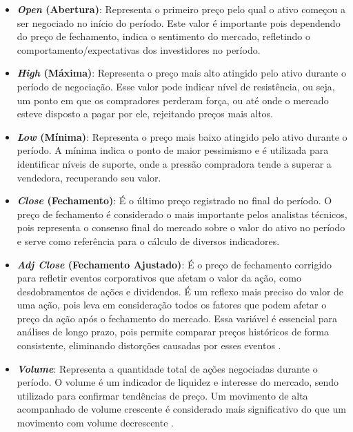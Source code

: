 \begin{itemize}
    \item \textbf{\textit{Open} (Abertura)}: Representa o primeiro preço pelo qual o ativo começou a ser negociado no início do período. Este valor é importante pois dependendo do preço de fechamento, indica o sentimento do mercado, refletindo o comportamento/expectativas dos investidores no período.

    \item \textbf{\textit{High} (Máxima)}: Representa o preço mais alto atingido pelo ativo durante o período de negociação. Esse valor pode indicar nível de resistência, ou seja, um ponto em que os compradores perderam força, ou até onde o mercado esteve disposto a pagar por ele, rejeitando preços mais altos.

    \item \textbf{\textit{Low} (Mínima)}: Representa o preço mais baixo atingido pelo ativo durante o período. A mínima indica o ponto de maior pessimismo e é utilizada para identificar níveis de suporte, onde a pressão compradora tende a superar a vendedora, recuperando seu valor.

    \item \textbf{\textit{Close} (Fechamento)}: É o último preço registrado no final do período. O preço de fechamento é considerado o mais importante pelos analistas técnicos, pois representa o consenso final do mercado sobre o valor do ativo no período e serve como referência para o cálculo de diversos indicadores.

    \item \textbf{\textit{Adj Close} (Fechamento Ajustado)}: É o preço de fechamento corrigido para refletir eventos corporativos que afetam o valor da ação, como desdobramentos de ações e dividendos. É um reflexo mais preciso do valor de uma ação, pois leva em consideração todos os fatores que podem afetar o preço da ação após o fechamento do mercado. Essa variável é essencial para análises de longo prazo, pois permite comparar preços históricos de forma consistente, eliminando distorções causadas por esses eventos \cite{site15}.

    \item \textbf{\textit{Volume}}: Representa a quantidade total de ações negociadas durante o período. O volume é um indicador de liquidez e interesse do mercado, sendo utilizado para confirmar tendências de preço. Um movimento de alta acompanhado de volume crescente é considerado mais significativo do que um movimento com volume decrescente \cite{site16}.
\end{itemize}

